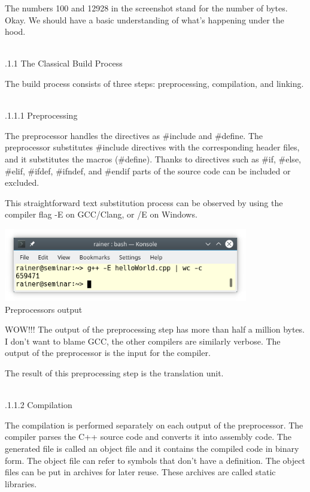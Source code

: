 The numbers 100 and 12928 in the screenshot stand for the number of bytes. Okay. We should have a basic understanding of what’s happening under the hood.

\hspace*{\fill} \\ %
.1.1\hspace{0.2cm} The Classical Build Process

The build process consists of three steps: preprocessing, compilation, and linking.

\hspace*{\fill} \\ %
.1.1.1\hspace{0.2cm} Preprocessing

The preprocessor handles the directives as \#include and \#define. The preprocessor substitutes \#include directives with the corresponding header files, and it substitutes the macros (\#define). Thanks to directives such as \#if, \#else, \#elif, \#ifdef, \#ifndef, and \#endif parts of the source code can be included or excluded.

This straightforward text substitution process can be observed by using the compiler flag -E on GCC/Clang, or /E on Windows.

\begin{center}
\includegraphics[width=0.8\textwidth]{content/3/chapter4/images/13.png}\\
Preprocessors output
\end{center}

WOW!!! The output of the preprocessing step has more than half a million bytes. I don’t want to blame GCC, the other compilers are similarly verbose. The output of the preprocessor is the input for the compiler.

The result of this preprocessing step is the translation unit.

\hspace*{\fill} \\ %
.1.1.2\hspace{0.2cm} Compilation

The compilation is performed separately on each output of the preprocessor. The compiler parses the C++ source code and converts it into assembly code. The generated file is called an object file and it contains the compiled code in binary form. The object file can refer to symbols that don’t have a definition. The object files can be put in archives for later reuse. These archives are called static libraries.

